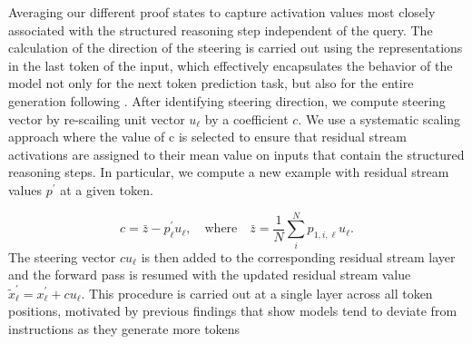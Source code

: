 Averaging our different proof states to capture activation values most closely associated with the structured reasoning step independent of the query.  The calculation of the direction of the steering is carried out using the representations in the last token of the input, which effectively encapsulates the behavior of the model not only for the next token prediction task, but also for the entire generation following \cite{todd2024function, Scalena_2024}. After identifying steering direction, we compute steering vector by re-scailing unit vector $u_\ell$ by a coefficient $c$. We use a systematic scaling approach where the value of c is selected to ensure that residual stream activations are assigned to their mean value on inputs that contain the structured reasoning steps.  In particular, we compute a new example with residual stream values $p^\prime$ at a given token. 

\[
c = \bar{z} - p_{\ell}^{\prime} u_\ell, \quad \text{where} \quad \bar{z} = \frac{1}{N} \sum_{i}^{N} p_{1,i,\ell} u_\ell.
\]
The steering vector $cu_\ell$ is then added to the corresponding residual stream layer and the forward pass is resumed with the updated residual stream value  $\tilde{x}_\ell^\prime = x_\ell^\prime + cu_\ell$. This procedure is carried out at a single layer across all token positions, motivated by previous findings that show models tend to deviate from instructions as they generate more tokens \cite{stolfo2024improvinginstructionfollowinglanguagemodels, li2024measuring}

